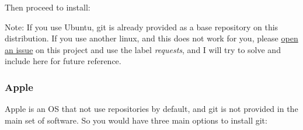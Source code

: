 \documentclass[
]{book}
\newenvironment{Shaded}{\begin{snugshade}}{\end{snugshade}}
\newcommand{\ExtensionTok}[1]{#1}
\newcommand{\NormalTok}[1]{#1}
\begin{document}
Then proceed to install:

\begin{Shaded}
\end{Shaded}

Note: If you use Ubuntu, git is already provided as a base repository on this
distribution. If you use another linux, and this does not work for you, please
\href{https://github.com/ricardobarroslourenco/CCprimer/issues}{open an issue} on
this project and use the label \emph{requests}, and I will try to solve and include
here for future reference.

\hypertarget{apple}{%
\subsubsection{Apple}\label{apple}}

Apple is an OS that not use repositories by default, and git is not provided in
the main set of software. So you would have three main options to install git:
\end{document}
